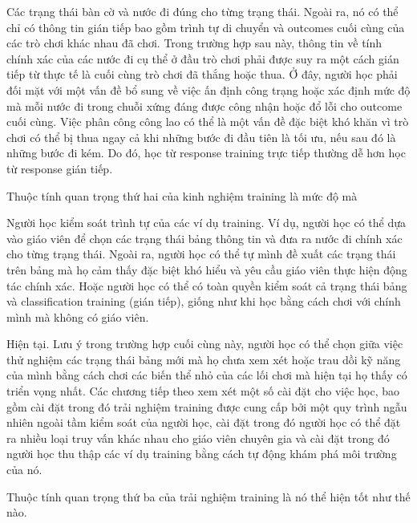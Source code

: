 Các trạng thái bàn cờ và nước đi đúng cho từng trạng thái. Ngoài ra, nó có thể chỉ có thông tin gián tiếp bao gồm trình tự di chuyển và outcomes cuối cùng của các trò chơi khác nhau đã chơi. Trong trường hợp sau này, thông tin về tính chính xác của các nước đi cụ thể ở đầu trò chơi phải được suy ra một cách gián tiếp từ thực tế là cuối cùng trò chơi đã thắng hoặc thua. Ở đây, người học phải đối mặt với một vấn đề bổ sung về việc ấn định công trạng hoặc xác định mức độ mà mỗi nước đi trong chuỗi xứng đáng được công nhận hoặc đổ lỗi cho outcome cuối cùng. Việc phân công công lao có thể là một vấn đề đặc biệt khó khăn vì trò chơi có thể bị thua ngay cả khi những bước đi đầu tiên là tối ưu, nếu sau đó là những bước đi kém. Do đó, học từ response training trực tiếp thường dễ hơn học từ response gián tiếp.

Thuộc tính quan trọng thứ hai của kinh nghiệm training là mức độ mà

Người học kiểm soát trình tự của các ví dụ training. Ví dụ, người học có thể dựa vào giáo viên để chọn các trạng thái bảng thông tin và đưa ra nước đi chính xác cho từng trạng thái. Ngoài ra, người học có thể tự mình đề xuất các trạng thái trên bảng mà họ cảm thấy đặc biệt khó hiểu và yêu cầu giáo viên thực hiện động tác chính xác. Hoặc người học có thể có toàn quyền kiểm soát cả trạng thái bảng và classification training (gián tiếp), giống như khi học bằng cách chơi với chính mình mà không có giáo viên.

Hiện tại. Lưu ý trong trường hợp cuối cùng này, người học có thể chọn giữa việc thử nghiệm các trạng thái bảng mới mà họ chưa xem xét hoặc trau dồi kỹ năng của mình bằng cách chơi các biến thể nhỏ của các lối chơi mà hiện tại họ thấy có triển vọng nhất. Các chương tiếp theo xem xét một số cài đặt cho việc học, bao gồm cài đặt trong đó trải nghiệm training được cung cấp bởi một quy trình ngẫu nhiên ngoài tầm kiểm soát của người học, cài đặt trong đó người học có thể đặt ra nhiều loại truy vấn khác nhau cho giáo viên chuyên gia và cài đặt trong đó người học thu thập các ví dụ training bằng cách tự động khám phá môi trường của nó.

Thuộc tính quan trọng thứ ba của trải nghiệm training là nó thể hiện tốt như thế nào.

